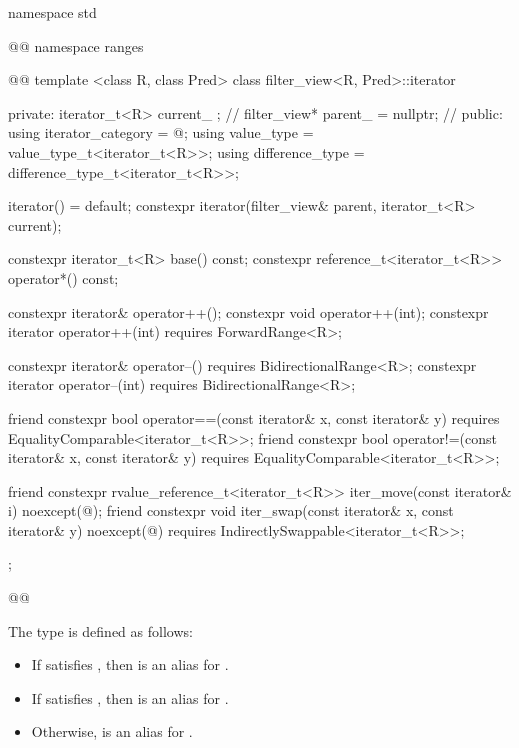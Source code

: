 %
\begin{codeblock}
namespace std { @@ namespace ranges { @@
  template <class R, class Pred>
  class filter_view<R, Pred>::iterator {
  private:
    iterator_t<R> current_ {}; // \expos
    filter_view* parent_ = nullptr; // \expos
  public:
    using iterator_category = @\seebelow@;
    using value_type = value_type_t<iterator_t<R>>;
    using difference_type = difference_type_t<iterator_t<R>>;

    iterator() = default;
    constexpr iterator(filter_view& parent, iterator_t<R> current);

    constexpr iterator_t<R> base() const;
    constexpr reference_t<iterator_t<R>> operator*() const;

    constexpr iterator& operator++();
    constexpr void operator++(int);
    constexpr iterator operator++(int) requires ForwardRange<R>;

    constexpr iterator& operator--() requires BidirectionalRange<R>;
    constexpr iterator operator--(int) requires BidirectionalRange<R>;

    friend constexpr bool operator==(const iterator& x, const iterator& y)
      requires EqualityComparable<iterator_t<R>>;
    friend constexpr bool operator!=(const iterator& x, const iterator& y)
      requires EqualityComparable<iterator_t<R>>;

    friend constexpr rvalue_reference_t<iterator_t<R>> iter_move(const iterator& i)
      noexcept(@\seebelow@);
    friend constexpr void iter_swap(const iterator& x, const iterator& y)
      noexcept(@\seebelow@) requires IndirectlySwappable<iterator_t<R>>;
  };
}}@\removed{\}\}}@
\end{codeblock}

\pnum
The type  is defined as follows:
\begin{itemize}
\item If  satisfies , then 
is an alias for .
\item If  satisfies , then 
is an alias for .
\item Otherwise,  is an alias for
.
\end{itemize}

